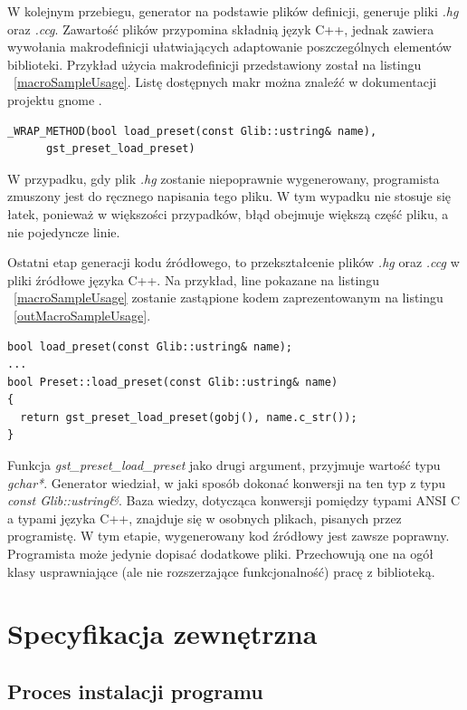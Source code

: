 \documentclass[12pt]{article}
\begin{document}
W kolejnym przebiegu, generator na podstawie plików definicji, generuje pliki \textit{.hg} oraz \textit{.ccg}. Zawartość plików przypomina składnią język C++, jednak zawiera wywołania makrodefinicji ułatwiających adaptowanie poszczególnych elementów biblioteki. Przykład użycia makrodefinicji przedstawiony został na listingu ~\ref{macroSampleUsage}.
Listę dostępnych makr można znaleźć w dokumentacji projektu gnome \cite{devgnomepage}.
    \begin{lstlisting}[caption=Przykład użycia makrodefinicji w pliku \textit{.hg}, label=macroSampleUsage]
_WRAP_METHOD(bool load_preset(const Glib::ustring& name), 
      gst_preset_load_preset)
    \end{lstlisting}
    W przypadku, gdy plik \textit{.hg} zostanie niepoprawnie wygenerowany, programista zmuszony jest do ręcznego napisania tego pliku. W tym wypadku nie stosuje się łatek, ponieważ w większości przypadków, błąd obejmuje większą część pliku, a nie pojedyncze linie.

Ostatni etap generacji kodu źródłowego, to przekształcenie plików \textit{.hg} oraz \textit{.ccg} w pliki źródłowe języka C++. Na przykład, line pokazane na listingu ~\ref{macroSampleUsage} zostanie zastąpione kodem zaprezentowanym na listingu ~\ref{outMacroSampleUsage}.
    \begin{lstlisting}[caption=Kod źródłowy wygenerowany na podstawie makrodefinicji, label=outMacroSampleUsage]
bool load_preset(const Glib::ustring& name);
...
bool Preset::load_preset(const Glib::ustring& name)
{
  return gst_preset_load_preset(gobj(), name.c_str());
}
    \end{lstlisting}
    Funkcja \textit{gst\_preset\_load\_preset} jako drugi argument, przyjmuje wartość typu \textit{gchar*}. Generator wiedział, w jaki sposób dokonać konwersji na ten typ z typu \textit{const Glib::ustring\&}. Baza wiedzy, dotycząca konwersji pomiędzy typami ANSI C a typami języka C++, znajduje się w osobnych plikach, pisanych przez programistę.
W tym etapie, wygenerowany kod źródłowy jest zawsze poprawny. Programista może jedynie dopisać dodatkowe pliki. Przechowują one na ogół klasy usprawniające (ale nie rozszerzające funkcjonalność) pracę z biblioteką.
\cleardoublepage
\section{Specyfikacja zewnętrzna}
\subsection{Proces instalacji programu}
\end{document}
